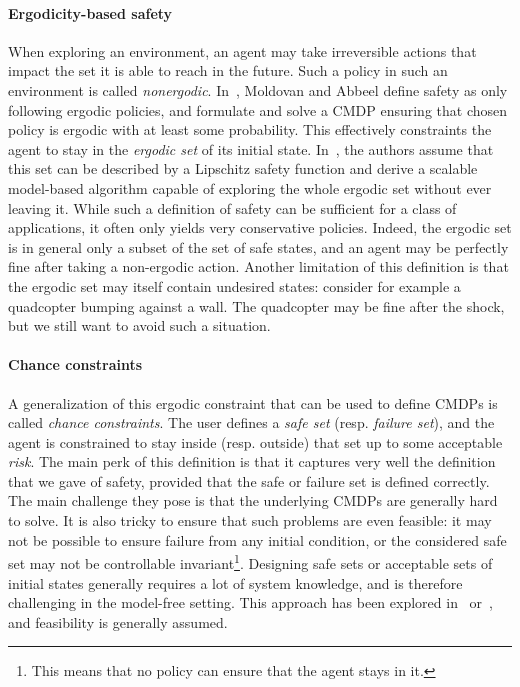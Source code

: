 		\paragraph{Ergodicity-based safety} When exploring an environment, an agent may take irreversible actions that impact the set it is able to reach in the future. Such a policy in such an environment is called\emph{ nonergodic}. In~\cite{moldovan2012safe}, Moldovan and Abbeel define safety as only following ergodic policies, and formulate and solve a CMDP ensuring that chosen policy is ergodic with at least some probability. This effectively constraints the agent to stay in the\emph{ ergodic set} of its initial state. In~\cite{turchetta2016safe}, the authors assume that this set can be described by a Lipschitz safety function and derive a scalable model-based algorithm capable of exploring the whole ergodic set without ever leaving it. While such a definition of safety can be sufficient for a class of applications, it often only yields very conservative policies. Indeed, the ergodic set is in general only a subset of the set of safe states, and an agent may be perfectly fine after taking a non-ergodic action. Another limitation of this definition is that the ergodic set may itself contain undesired states: consider for example a quadcopter bumping against a wall. The quadcopter may be fine after the shock, but we still want to avoid such a situation.
		
		\paragraph{Chance constraints} A generalization of this ergodic constraint that can be used to define CMDPs is called\emph{ chance constraints}. The user defines a\emph{ safe set} (resp.\emph{ failure set}), and the agent is constrained to stay inside (resp. outside) that set up to some acceptable\emph{ risk}. The main perk of this definition is that it captures very well the definition that we gave of safety, provided that the safe or failure set is defined correctly. The main challenge they pose is that the underlying CMDPs are generally hard to solve. It is also tricky to ensure that such problems are even feasible: it may not be possible to ensure failure from any initial condition, or the considered safe set may not be controllable invariant\footnote{This means that no policy can ensure that the agent stays in it.}. Designing safe sets or acceptable sets of initial states generally requires a lot of system knowledge, and is therefore challenging in the model-free setting. This approach has been explored in~\cite{paternain2019safe} or~\cite{geibel2005risk}, and feasibility is generally assumed. 
		
